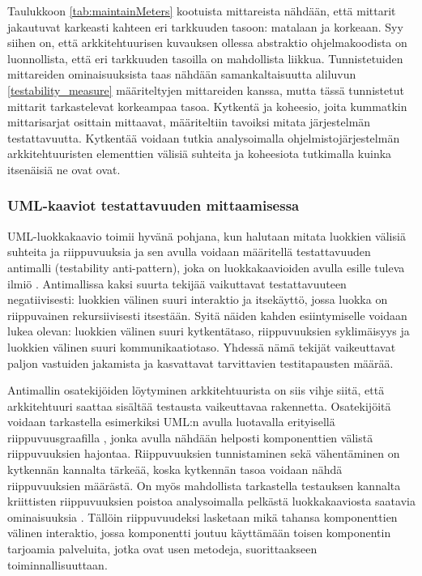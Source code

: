 \documentclass[finnish]{tktltiki2}
\numberwithin{table}{section}
\theoremstyle{definition}
\theoremstyle{remark}
\begin{document}
\noindent
Taulukkoon \ref{tab:maintainMeters} kootuista mittareista nähdään, että mittarit jakautuvat karkeasti kahteen eri tarkkuuden tasoon: matalaan ja korkeaan. Syy siihen on, että arkkitehtuurisen kuvauksen ollessa abstraktio ohjelmakoodista on luonnollista, että eri tarkkuuden tasoilla on mahdollista liikkua. Tunnistetuiden mittareiden ominaisuuksista taas nähdään samankaltaisuutta aliluvun \ref{testability_measure} määriteltyjen mittareiden kanssa, mutta tässä tunnistetut mittarit tarkastelevat korkeampaa tasoa. Kytkentä ja koheesio, joita kummatkin mittarisarjat osittain mittaavat,  määriteltiin tavoiksi mitata järjestelmän testattavuutta. Kytkentää voidaan tutkia analysoimalla ohjelmistojärjestelmän arkkitehtuuristen elementtien välisiä suhteita ja koheesiota tutkimalla kuinka itsenäisiä ne ovat ovat.

\subsubsection{UML-kaaviot testattavuuden mittaamisessa} \label{uml_arch_test}

UML-luokkakaavio toimii hyvänä pohjana, kun halutaan mitata luokkien välisiä suhteita ja riippuvuuksia \citep{baudry_testability_2002} ja sen avulla voidaan määritellä testattavuuden antimalli (testability anti-pattern), joka on luokkakaavioiden avulla esille tuleva ilmiö \citep{baudry_measuring_2003}. Antimallissa kaksi suurta tekijää vaikuttavat testattavuuteen negatiivisesti: luokkien välinen suuri interaktio ja itsekäyttö, jossa luokka on riippuvainen rekursiivisesti itsestään. Syitä näiden kahden esiintymiselle voidaan lukea olevan: luokkien välinen suuri kytkentätaso, riippuvuuksien syklimäisyys ja luokkien välinen suuri kommunikaatiotaso. Yhdessä nämä tekijät vaikeuttavat paljon vastuiden jakamista ja kasvattavat tarvittavien testitapausten määrää. 

Antimallin osatekijöiden löytyminen arkkitehtuurista on siis vihje siitä, että arkkitehtuuri saattaa sisältää testausta vaikeuttavaa rakennetta. Osatekijöitä voidaan tarkastella esimerkiksi UML:n avulla luotavalla erityisellä riippuvuusgraafilla \citep{baudry_testability_2002}, jonka avulla nähdään helposti komponenttien välistä riippuvuuksien hajontaa. Riippuvuuksien tunnistaminen sekä vähentäminen on kytkennän kannalta tärkeää, koska kytkennän tasoa voidaan nähdä riippuvuuksien määrästä.  On myös mahdollista tarkastella testauksen kannalta kriittisten riippuvuuksien poistoa analysoimalla pelkästä luokkakaaviosta saatavia ominaisuuksia \citep{Jungmayr:2002}. Tällöin riippuvuudeksi lasketaan mikä tahansa komponenttien välinen interaktio, jossa komponentti joutuu käyttämään toisen komponentin tarjoamia palveluita, jotka ovat usen metodeja, suorittaakseen toiminnallisuuttaan. 
\end{document}
